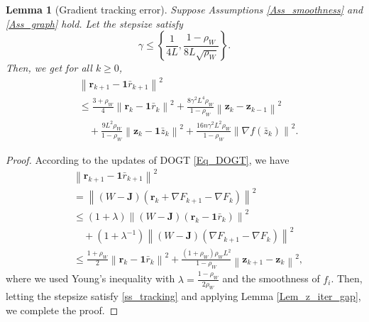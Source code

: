 \documentclass[letterpaper, 10 pt, conference]{ieeeconf}
\newtheorem{Lem}{Lemma}
\begin{document}
\begin{Lem}[Gradient tracking error]\label{Lem_track}
Suppose Assumptions \ref{Ass_smoothness} and \ref{Ass_graph} hold. Let the stepsize satisfy
\begin{equation}\label{ss_tracking}
\gamma \leqslant \left\{ \frac{1}{4L}, \frac{1-\rho _W}{8L\sqrt{\rho _W}} \right\}.
\end{equation}
Then, we get for all $k \geqslant 0$,
\begin{equation}
\begin{aligned}
&\left\| \mathbf{r}_{k+1}-\mathbf{1}\bar{r}_{k+1} \right\| ^2
\\
&\leqslant \frac{3+\rho _W}{4}\left\| \mathbf{r}_k-\mathbf{1}\bar{r}_k \right\| ^2+\frac{8\gamma ^2L^4\rho _W}{1-\rho _W}\left\| \mathbf{z}_k-\mathbf{z}_{k-1} \right\| ^2
\\
&\quad +\frac{9L^2\rho _W}{1-\rho _W}\left\| \mathbf{z}_k-\mathbf{1}\bar{z}_k \right\| ^2+\frac{16n\gamma ^2L^2\rho _W}{1-\rho _W}\left\| \nabla f\left( \bar{z}_k \right) \right\| ^2.
\end{aligned}
\end{equation}
\end{Lem}

\begin{proof}
According to the updates of DOGT \eqref{Eq_DOGT}, we have
\begin{equation*}
\begin{aligned}
&\left\| \mathbf{r}_{k+1}-\mathbf{1}\bar{r}_{k+1} \right\| ^2
\\
&=\left\| \left( W-\mathbf{J} \right) \left( \mathbf{r}_k+\nabla F_{k+1}-\nabla F_k \right) \right\| ^2
\\
&\leqslant \left( 1+\lambda \right) \left\| \left( W-\mathbf{J} \right) \left( \mathbf{r}_k-\mathbf{1}\bar{r}_k \right) \right\| ^2
\\
&\quad+\left( 1+\lambda ^{-1} \right) \left\| \left( W-\mathbf{J} \right) \left( \nabla F_{k+1}-\nabla F_k \right) \right\| ^2
\\
&\leqslant \frac{1+\rho _W}{2}\left\| \mathbf{r}_k-\mathbf{1}\bar{r}_k \right\| ^2+\frac{\left( 1+\rho _W \right) \rho _WL^2}{1-\rho _W}\left\| \mathbf{z}_{k+1}-\mathbf{z}_k \right\| ^2,
\end{aligned}
\end{equation*}
where we used Young's inequality with $\lambda =\frac{1-\rho _W}{2\rho _W}$ and the smoothness of $f_i$. Then, 
letting the stepsize satisfy \eqref{ss_tracking} and applying Lemma \ref{Lem_z_iter_gap}, we complete the proof.
\end{proof}
\end{document}
